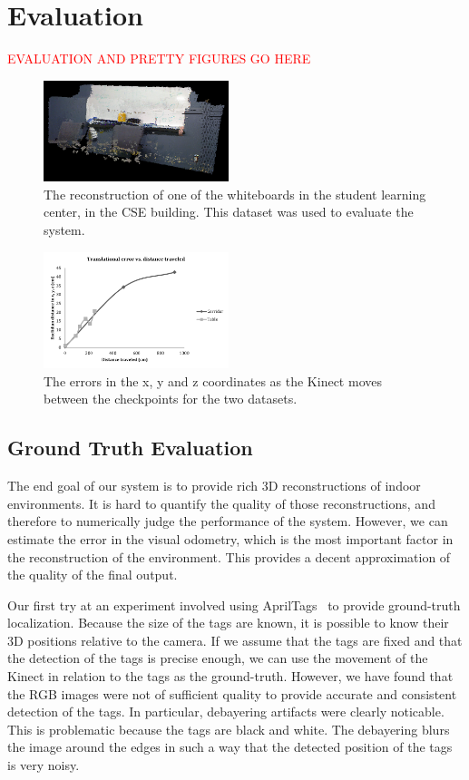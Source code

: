 \documentclass[letterpaper, 10pt, conference]{ieeeconf}
\newcommand{\xxx}[1]{\textcolor{red}{#1}}
\begin{document}
\section{Evaluation}
\xxx{EVALUATION AND PRETTY FIGURES GO HERE}
\begin{figure}[t]
\centering
\includegraphics[width=0.48\textwidth]{figures/cropped_gt_slc.png}
\caption{The reconstruction of one of the whiteboards in the student learning center,
in the CSE building. This dataset was used to evaluate the system.}
\label{fig:gt-slc}
\end{figure}

\begin{figure}[t]
\centering
\includegraphics[width=0.48\textwidth]{figures/gt_translational.pdf}
\caption{The errors in the x, y and z coordinates as the Kinect moves between the checkpoints
for the two datasets.}
\label{fig:plot-trans}
\end{figure}

\subsection{Ground Truth Evaluation}
The end goal of our system is to provide rich 3D reconstructions of indoor environments.
It is hard to quantify the quality of those reconstructions, and therefore to numerically
judge the performance of the system. However, we can estimate the error in the visual odometry,
which is the most important factor in the reconstruction of the environment. This provides
a decent approximation of the quality of the final output.

Our first try at an experiment involved using AprilTags~\cite{olson2011tags} to
provide ground-truth localization. Because the size of the tags are known, it is
possible to know their 3D positions relative to the camera. If we assume that the tags are fixed and that
the detection of the tags is precise enough, we can use the movement of the
Kinect in relation to the tags as the ground-truth. However, we have found that
the RGB images were not of sufficient quality to provide accurate and consistent
detection of the tags. In particular, debayering artifacts were clearly noticable.
This is problematic because the tags are black and white. The debayering blurs the
image around the edges in such a way that the detected position of the tags is very noisy.
\end{document}
